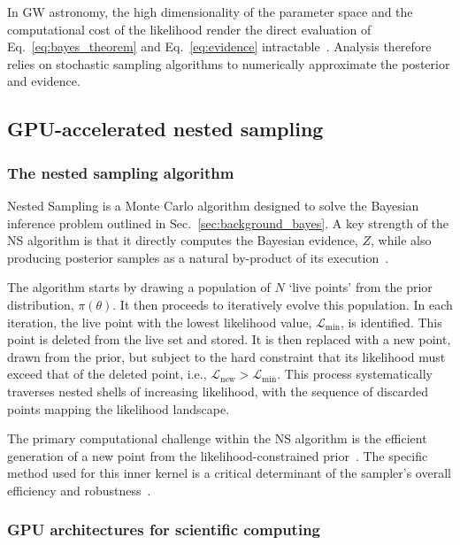 \documentclass[fleqn,usenatbib]{mnras}
\begin{document}
In GW astronomy, the high dimensionality of the parameter space and
the computational cost of the likelihood render the direct evaluation
of Eq.~\ref{eq:bayes_theorem} and Eq.~\ref{eq:evidence} intractable~\citep{LIGO_guide_signalextraction}.
Analysis therefore relies on stochastic sampling algorithms to
numerically approximate the posterior and evidence.

\subsection{GPU-accelerated nested sampling}

\label{sec:background_ns_and_gpus}

\subsubsection{The nested sampling algorithm}
\label{sec:background_ns}

Nested Sampling is a Monte Carlo algorithm designed to solve the
Bayesian inference problem outlined in Sec.~\ref{sec:background_bayes}.
A key strength of the NS algorithm is that it directly computes the
Bayesian evidence, $Z$, while also producing posterior samples as a
natural by-product of its execution~\citep{skilling, dynamic_ns}.

The algorithm starts by drawing a population of $N$ `live points'
from the prior distribution, $\pi(\theta)$. It then proceeds to iteratively evolve this population. 
In each iteration, the live point with the lowest
likelihood value, $\mathcal{L}_{\text{min}}$, is identified. This point
is deleted from the live set and stored. It is then replaced with a
new point, drawn from the prior, but subject to the hard constraint that
its likelihood must exceed that of the deleted point,
i.e., $\mathcal{L}_{\text{new}} > \mathcal{L}_{\text{min}}$. This process
systematically traverses nested shells of increasing likelihood, with
the sequence of discarded points mapping the likelihood landscape.

The primary computational challenge within the NS algorithm is the
efficient generation of a new point from the likelihood-constrained
prior~\citep{NSNature}. The specific method used for this inner kernel is a
critical determinant of the sampler's overall efficiency and robustness~\citep{NS_methods_buchner}.

\subsubsection{GPU architectures for scientific computing}
\label{sec:background_gpus}
\end{document}
